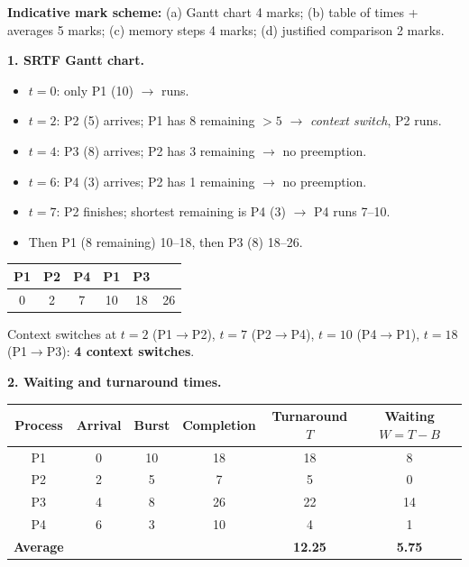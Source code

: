 \documentclass[11pt]{article}
\begin{document}
\begin{corrige}
\textbf{Indicative mark scheme:} (a) Gantt chart 4 marks; (b) table of times + averages 5 marks; (c) memory steps 4 marks; (d) justified comparison 2 marks.

\textbf{1. SRTF Gantt chart.}
\begin{itemize}
\item $t=0$: only P1 (10) $\rightarrow$ runs.
\item $t=2$: P2 (5) arrives; P1 has 8 remaining $> 5$ $\rightarrow$ \emph{context switch}, P2 runs.
\item $t=4$: P3 (8) arrives; P2 has 3 remaining $\rightarrow$ no preemption.
\item $t=6$: P4 (3) arrives; P2 has 1 remaining $\rightarrow$ no preemption.
\item $t=7$: P2 finishes; shortest remaining is P4 (3) $\rightarrow$ P4 runs 7--10.
\item Then P1 (8 remaining) 10--18, then P3 (8) 18--26.
\end{itemize}
\begin{center}
\begin{tabular}{|c|c|c|c|cc|}\hline
P1 & P2 & P4 & P1 & P3 \\ \hline
0 & 2 & 7 & 10 & 18 & 26 \\ \hline
\end{tabular}
\end{center}
Context switches at $t=2$ (P1$\to$P2), $t=7$ (P2$\to$P4), $t=10$ (P4$\to$P1), $t=18$ (P1$\to$P3): \textbf{4 context switches}.

\textbf{2. Waiting and turnaround times.}
\begin{center}
\begin{tabular}{|c|c|c|c|c|c|}\hline
\rowcolor{popblueL} Process & Arrival & Burst & Completion & Turnaround $T$ & Waiting $W = T - B$ \\ \hline
P1 & 0 & 10 & 18 & 18 & 8 \\ \hline
P2 & 2 & 5 & 7 & 5 & 0 \\ \hline
P3 & 4 & 8 & 26 & 22 & 14 \\ \hline
P4 & 6 & 3 & 10 & 4 & 1 \\ \hline
\textbf{Average} & & & & \textbf{12.25} & \textbf{5.75} \\ \hline
\end{tabular}
\end{center}


\end{corrige}
\end{document}
